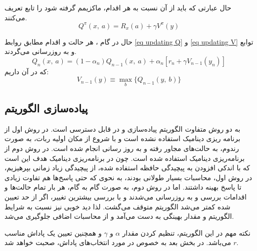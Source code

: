 حال عبارتی که باید از آن نسبت به هر اقدام، ماکزیمم گرفته شود را تابع  تعریف می‌کنند.
\begin{equation}
Q^\pi (x,~a) = R_x(a) + \gamma V^\pi (y)
\end{equation}

حال در گام ، هر حالت و اقدام مطابق روابط \ref{eq updating Q} و \ref{eq updating V} توابع  و  به روزرسانی می‌گردند.
\begin{equation}\label{eq updating Q}
Q_n(x,~a) = (1-\alpha_n)Q_{n-1}(x,~a) + \alpha_n[r_n + \gamma V_{n-1}(y_n)]
\end{equation}
که در آن داریم:
\begin{equation}\label{eq updating V}
V_{n-1}(y) \equiv \max_{b}\{Q_{n-1}(y,~b)\}
\end{equation}

\subsection{پیاده‌سازی الگوریتم }
به دو روش متفاوت الگوریتم  پیاده‌سازی و در \cite{roozbeh2020} قابل دسترسی است. در روش اول از برنامه ریزی دینامیک استفاده نشده است و با شروع از مکان اولیه ربات، به صورت رندوم، به حالت‌های مجاور رفته و به روز رسانی انجام شده است. در روش دوم از برنامه‌ریزی دینامیک استفاده شده است. چون در برنامه‌ریزی دینامیک هدف این است که با اندکی افزودن به پیچیدگی حافظه استفاده شده، از پیچیدگی زیاد زمانی بپرهیزیم، در روش اول، محاسبات بسیار طولانی بودند، به نحوی که حتی پاسخ‌ها هم تفاوت زیادی تا پاسخ بهینه داشتند. اما در روش دوم، به صورت گام به گام، هر بار تمام حالت‌ها و اقدامات بررسی و به روزرسانی می‌شدند و با بررسی بیشترین تغییر، اگر از حد تعیین شده کمتر می‌شد الگوریتم متوقف می‌گشت. لذا دید خوبی نیز نسبت به شرایط الگوریتم و مقدار بهینگی به دست می‌آمد و از محاسبات اضافی جلوگیری می‌شد.

نکته مهم در این الگوریتم، تنظیم کردن مقدار $\alpha$ و $\gamma$ و همچنین تعیین یک پاداش مناسب $r$ می‌باشد. در بخش بعد به خصوص در مورد انتخاب‌های پاداش، صحبت خواهد شد.

